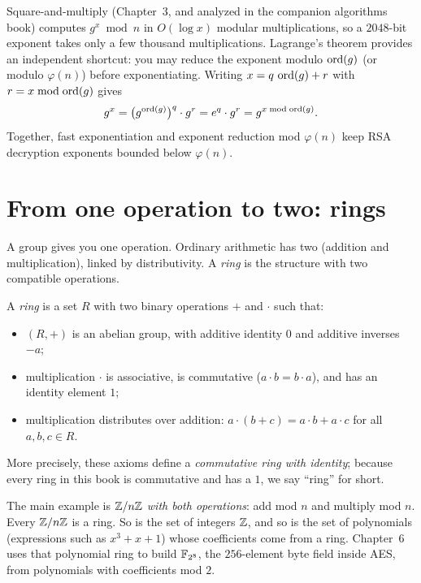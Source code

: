 \begin{connectionbox}
Square-and-multiply (Chapter~3, and analyzed in the companion algorithms book) computes $g^x \bmod n$ in $O(\log x)$ modular multiplications, so a $2048$-bit exponent takes only a few thousand multiplications. Lagrange's theorem provides an independent shortcut: you may reduce the exponent modulo $\operatorname{ord}(g)$ (or modulo $\varphi(n)$) before exponentiating. Writing $x = q\,\operatorname{ord}(g) + r$ with $r = x \bmod \operatorname{ord}(g)$ gives
\[
  g^x = \bigl(g^{\operatorname{ord}(g)}\bigr)^q \cdot g^r = e^q \cdot g^r = g^{x \bmod \operatorname{ord}(g)}.
\]
Together, fast exponentiation and exponent reduction mod $\varphi(n)$ keep RSA decryption exponents bounded below $\varphi(n)$.
\end{connectionbox}

\section{From one operation to two: rings}
\label{ch05:rings}

A group gives you one operation. Ordinary arithmetic has two (addition and
multiplication), linked by distributivity. A \emph{ring} is the structure with two compatible operations.

\begin{definition}
\label{ch05:def-ring}
A \emph{ring} is a set $R$ with two binary operations $+$ and $\cdot$ such that:
\begin{itemize}
  \item $(R,+)$ is an abelian group, with additive identity $0$ and additive inverses $-a$;
  \item multiplication $\cdot$ is associative, is commutative ($a\cdot b = b\cdot a$), and has an identity element $1$;
  \item multiplication distributes over addition: $a\cdot(b+c) = a\cdot b + a\cdot c$ for all $a,b,c \in R$.
\end{itemize}
More precisely, these axioms define a \emph{commutative ring with identity}; because every ring in this book is commutative and has a $1$, we say ``ring'' for short.
\end{definition}

The main example is $\mathbb{Z}/n\mathbb{Z}$ \emph{with both operations}: add mod $n$ and multiply mod
$n$. Every $\mathbb{Z}/n\mathbb{Z}$ is a ring. So is the set of integers $\mathbb{Z}$, and so is the set of polynomials (expressions such as $x^3 + x + 1$) whose coefficients come from a ring. Chapter~6 uses that polynomial ring to build $\mathbb{F}_{2^8}$, the $256$-element byte field inside AES, from polynomials with coefficients mod $2$.

